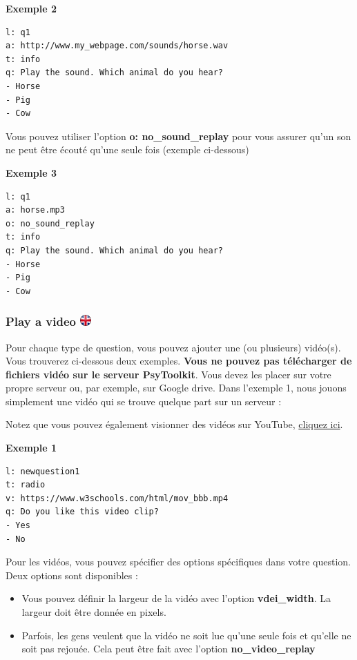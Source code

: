 \documentclass[
]{book}
\providecommand{\tightlist}{%
  \setlength{\itemsep}{0pt}\setlength{\parskip}{0pt}}
\begin{document}
\textbf{Exemple 2}

\begin{verbatim}
l: q1
a: http://www.my_webpage.com/sounds/horse.wav
t: info
q: Play the sound. Which animal do you hear?
- Horse
- Pig
- Cow
\end{verbatim}

Vous pouvez utiliser l'option \textbf{o: no\_sound\_replay} pour vous assurer qu'un son ne peut être écouté qu'une seule fois (exemple ci-dessous)

\textbf{Exemple 3}

\begin{verbatim}
l: q1
a: horse.mp3
o: no_sound_replay
t: info
q: Play the sound. Which animal do you hear?
- Horse
- Pig
- Cow
\end{verbatim}

\hypertarget{play-a-video}{%
\subsubsection[Play a video ]{\texorpdfstring{Play a video \href{https://www.psytoolkit.org/doc3.1.0/online-survey-syntax.html\#video}{\protect\includegraphics{img/ukflag.png}}}{Play a video }}\label{play-a-video}}

Pour chaque type de question, vous pouvez ajouter une (ou plusieurs) vidéo(s). Vous trouverez ci-dessous deux exemples. \textbf{Vous ne pouvez pas télécharger de fichiers vidéo sur le serveur PsyToolkit}. Vous devez les placer sur votre propre serveur ou, par exemple, sur Google drive.
Dans l'exemple 1, nous jouons simplement une vidéo qui se trouve quelque part sur un serveur :

Notez que vous pouvez également visionner des vidéos sur YouTube, \protect\hyperlink{Youtube}{cliquez ici}.

\textbf{Exemple 1}

\begin{verbatim}
l: newquestion1
t: radio
v: https://www.w3schools.com/html/mov_bbb.mp4
q: Do you like this video clip?
- Yes
- No
\end{verbatim}

Pour les vidéos, vous pouvez spécifier des options spécifiques dans votre question. Deux options sont disponibles :

\begin{itemize}
\tightlist
\item
  Vous pouvez définir la largeur de la vidéo avec l'option \textbf{vdei\_width}. La largeur doit être donnée en pixels.
\item
  Parfois, les gens veulent que la vidéo ne soit lue qu'une seule fois et qu'elle ne soit pas rejouée. Cela peut être fait avec l'option \textbf{no\_video\_replay}
\end{itemize}
\end{document}
